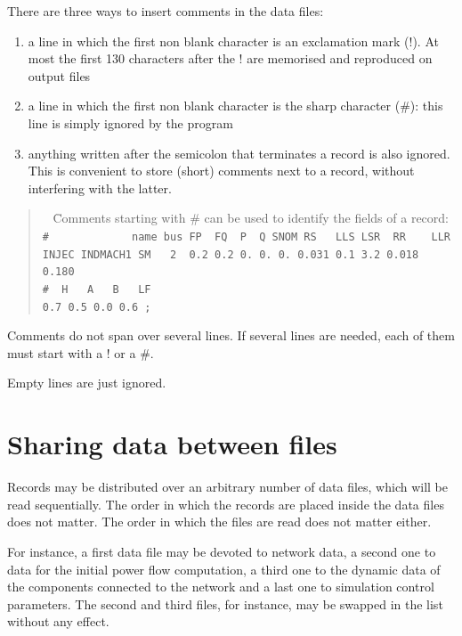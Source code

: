 There are three ways to insert comments in the data files:
\begin{enumerate}
\item a line in which the first non blank character is an exclamation mark (!). At most the first 130 characters after the ! are memorised and reproduced on output files
\item a line in which the first non blank character is the sharp character (\#): this line is simply ignored by the program
\item anything written after the semicolon that terminates a record is also ignored. This is convenient to store (short) comments next to a record, without interfering with the latter.
\end{enumerate}

\begin{quote}
\begin{tabbing}
\faHandPointRight ~ \= \rm Comments starting with \# can be used to identify the fields of a record: \\
\> \tt  \# ~~~~~~~~~~~ name bus FP  ~FQ ~P  ~Q  \= \tt SNOM  RS  ~~LLS LSR  ~RR ~~~LLR\\
\> \tt  INJEC INDMACH1  SM   ~~2 ~0.2 0.2 0.~0.~0.~0.031 0.1 3.2 0.018 0.180\\
\> \tt  \# \> \tt    ~H  ~~A ~~B ~~LF \\
\> \> \tt    0.7 0.5 0.0 0.6 ;
\end{tabbing}
\end{quote} 

Comments do not span over several lines. If several lines are needed, each of them must start with a ! or a \#.

Empty lines are just ignored.


\section{Sharing data between files}

Records may be distributed over an arbitrary number of data files, which will be read sequentially. The order in which the records are placed inside the data files does not matter. The order in which the files are read does not matter either.

For instance, a first data file may be devoted to network data, a second one to data for the initial power flow computation, a third one to the dynamic data of the components connected to the network and a last one to simulation control parameters. The second and third files, for instance, may be swapped in the list without any effect.



